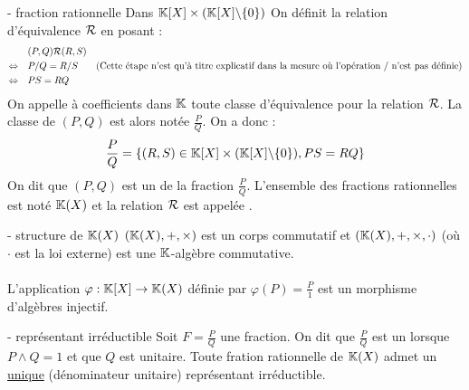

\everymath{\displaystyle}

    \begin{definition}{17.1}{ - fraction rationnelle}
        Dans $\mathbb{K}[X] \times (\mathbb{K}[X] \backslash \{0\})$ On définit la relation d'équivalence $\mathcal{R}$ en posant : \begin{align*}
            &(P,Q)\mathcal{R}(R,S) &&\\
            \Leftrightarrow \quad& P/Q = R/S && \text{(Cette étape n'est qu'à titre explicatif dans la mesure où l'opération / n'est pas définie)} \\
            \Leftrightarrow \quad& PS = RQ &&\\
        \end{align*}
    On appelle  à coefficients dans $\mathbb{K}$ toute classe d'équivalence pour la relation $\mathcal{R}$. La classe de $(P,Q)$ est alors notée $\displaystyle \frac{P}{Q}$. On a donc : 
    $$\frac{P}{Q} = \{(R,S) \in \mathbb{K}[X] \times (\mathbb{K}[X] \backslash \{0\}), PS = RQ\}$$
    On dit que $(P,Q)$ est un  de la fraction $\displaystyle\frac{P}{Q}$. L'ensemble des fractions rationnelles est noté $\mathbb{K}(X)$ et la relation $\mathcal{R}$ est appelée .

    \end{definition} 

    \begin{proposition}{16.4}{ - structure de $\mathbb{K}(X)$}
        $(\mathbb{K}(X),+,\times)$ est un corps commutatif et $(\mathbb{K}(X),+,\times,\cdot)$ (où $\cdot$ est la loi externe) est une $\mathbb{K}$-algèbre commutative. \\ \\
        L'application $\varphi : \mathbb{K}[X] \rightarrow \mathbb{K}(X)$ définie par $ \varphi(P) = \frac{P}{1}$ est un morphisme d'algèbres injectif.
    \end{proposition}

    \begin{definition}{17.7}{ - représentant irréductible}
        Soit $F = \frac{P}{Q}$ une fraction. On dit que $\frac{P}{Q}$ est un  lorsque $P \wedge Q = 1$ et que $Q$ est unitaire. Toute fration rationnelle de $\mathbb{K}(X)$ admet un \underline{unique} (dénominateur unitaire) représentant irréductible.
    \end{definition}

